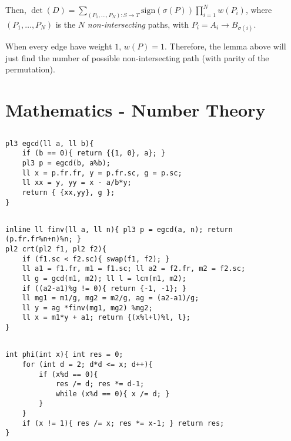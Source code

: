 \documentclass[landscape, 8pt, a4paper, oneside, twocolumn]{extarticle}
\begin{document}
Then, $\det(D) = \sum_{(P_1, \ldots, P_N) \colon S \to T} \mathrm{sign}(\sigma(P)) \prod_{i=1}^{N} w(P_i)$, where $(P_1, \ldots, P_N)$ is the $N$ \textit{non-intersecting} paths, with $P_i = A_i \to B_{\sigma(i)}$.

When every edge have weight $1$, $w(P) = 1$. Therefore, the lemma above will just find the number of possible non-intersecting path (with parity of the permutation).
\section{Mathematics - Number Theory}
\subsection{}
\subsection{}
\begin{verbatim}
pl3 egcd(ll a, ll b){
    if (b == 0){ return {{1, 0}, a}; }
    pl3 p = egcd(b, a%b);
    ll x = p.fr.fr, y = p.fr.sc, g = p.sc;
    ll xx = y, yy = x - a/b*y;
    return { {xx,yy}, g };
}
\end{verbatim}
\subsection{}
\begin{verbatim}
inline ll finv(ll a, ll n){ pl3 p = egcd(a, n); return (p.fr.fr%n+n)%n; }
pl2 crt(pl2 f1, pl2 f2){
    if (f1.sc < f2.sc){ swap(f1, f2); }
    ll a1 = f1.fr, m1 = f1.sc; ll a2 = f2.fr, m2 = f2.sc;
    ll g = gcd(m1, m2); ll l = lcm(m1, m2);
    if ((a2-a1)%g != 0){ return {-1, -1}; }
    ll mg1 = m1/g, mg2 = m2/g, ag = (a2-a1)/g;
    ll y = ag *finv(mg1, mg2) %mg2;
    ll x = m1*y + a1; return {(x%l+l)%l, l};
}
\end{verbatim}
\subsection{}
\begin{verbatim}
int phi(int x){ int res = 0;
    for (int d = 2; d*d <= x; d++){
        if (x%d == 0){
            res /= d; res *= d-1;
            while (x%d == 0){ x /= d; }
        }
    }
    if (x != 1){ res /= x; res *= x-1; } return res;
}
\end{verbatim}
\end{document}
